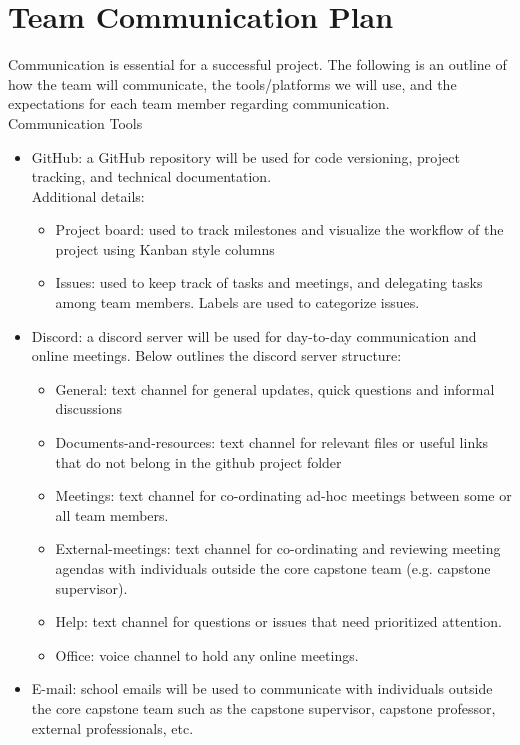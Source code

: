 \documentclass{article}
\begin{document}
\section{Team Communication Plan}

Communication is essential for a successful project. The following is an outline of how the team will 
communicate, the tools/platforms we will use, and the expectations for each team member regarding communication.\\

Communication Tools
\begin{itemize}
  \item GitHub: a GitHub repository will be used for code versioning, project tracking, and technical documentation.\\
  Additional details:
  \begin{itemize}
    \item Project board: used to track milestones and visualize the workflow of the project using Kanban style columns
    \item Issues: used to keep track of tasks and meetings, and delegating tasks among team members. Labels are used
     to categorize issues.
  \end{itemize}
  \item Discord: a discord server will be used for day-to-day communication and online meetings. Below outlines the 
  discord server structure:
  \begin{itemize}
    \item General: text channel for general updates, quick questions and informal discussions
    \item Documents-and-resources: text channel for relevant files or useful links that do not belong in the github 
    project folder
    \item Meetings: text channel for co-ordinating ad-hoc meetings between some or all team members.
    \item External-meetings: text channel for co-ordinating and reviewing meeting agendas with individuals 
    outside the core capstone team (e.g. capstone supervisor).
    \item Help: text channel for questions or issues that need prioritized attention.
    \item Office: voice channel to hold any online meetings.
  \end{itemize}
  \item E-mail: school emails will be used to communicate with individuals outside the core capstone team such as the 
  capstone supervisor, capstone professor, external professionals, etc.
\end{itemize}
\end{document}
